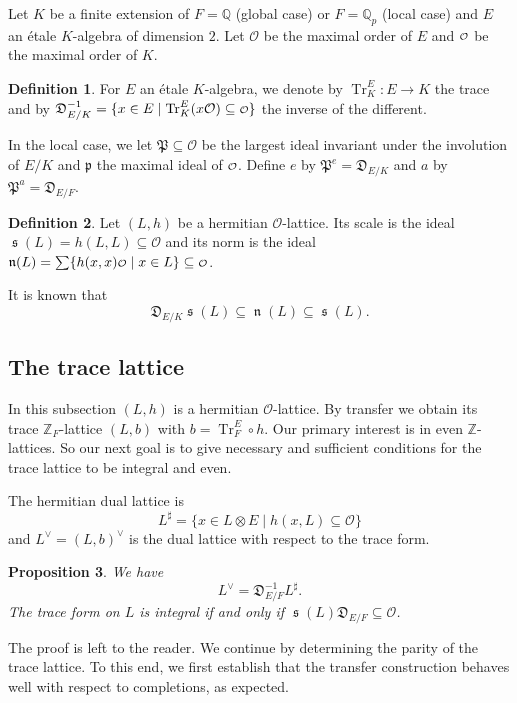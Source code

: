 \documentclass[a4paper]{amsart}
\theoremstyle{definition}
\newtheorem{definition}{Definition}[section]
\theoremstyle{plain}
\newtheorem{proposition}[definition]{Proposition}
\DeclareMathOperator{\Tr}{Tr}
\DeclareMathOperator{\scale}{\mathfrak{s}}
\DeclareMathOperator{\norm}{\mathfrak{n}}
\newcommand{\QQ}{\mathbb{Q}}
\newcommand{\ZZ}{\mathbb{Z}}
\renewcommand{\O}{\mathcal{O}}
\newcommand{\fp}{\mathfrak{p}}
\newcommand{\FP}{\mathfrak{P}}
\newcommand{\FD}{\mathfrak{D}}
\renewcommand\o{
  \mathchoice
    {{\scriptstyle\mathcal{O}}}%
    {{\scriptstyle\mathcal{O}}}%
    {{\scriptscriptstyle\mathcal{O}}}%
    {\scalebox{.7}{$\scriptscriptstyle\mathcal{O}$}}%
  }
\newcommand{\sprodq}[2]{h( #1,#1)}
\begin{document}
Let $K$ be a finite extension of $F=\QQ$ (global case) or $F=\QQ_p$ (local case) and $E$ an étale $K$-algebra of dimension $2$.
Let $\O$ be the maximal order of $E$ and $\o$ be the maximal order of $K$.

\begin{definition}
 For $E$ an \'etale $K$-algebra, we denote by
 $\Tr^E_K \colon E \to K$ the trace and by
  $\FD_{E/K}^{-1}=\{ x \in E \mid \Tr^E_K(x \O) \subseteq \o \}$
 the inverse of the different.
\end{definition}

In the local case, we let $\FP\subseteq \O$ be the largest ideal invariant under the involution of $E/K$ and $\fp$ the maximal ideal of $\o$. Define $e$ by $\FP^e = \FD_{E/K}$ and $a$ by $\FP^a = \FD_{E/F}$.

\begin{definition}
 Let $(L,h)$ be a hermitian $\mathcal O$-lattice. Its scale is the ideal $\scale(L)=h(L,L)\subseteq \O$ and its norm is the ideal $\norm(L)=\sum \{ \sprodq{x}{}\o \mid x \in L \} \subseteq \o$.
\end{definition}
It is known that
\begin{equation}\label{norm-vs-scale}
 \FD_{E/K} \scale(L) \subseteq \norm(L) \subseteq \scale(L).
\end{equation}

\subsection{The trace lattice}
In this subsection $(L,h)$ is a hermitian $\O$-lattice. By transfer we obtain its trace $\ZZ_F$-lattice $(L,b)$ with $b = \Tr^E_{F} \circ h$.
Our primary interest is in even $\ZZ$-lattices. So our next goal is to give necessary and sufficient conditions for the trace lattice to be integral and even.


The hermitian dual lattice is
\[L^\sharp = \{x \in L \otimes E \mid h(x,L) \subseteq \O\}\]
and $L^\vee = (L,b)^\vee$ is the dual lattice with respect to the trace form.

\begin{proposition}\label{trace-integral}
We have
\[L^\vee = {\FD_{E/F}^{-1}} L^\sharp.\]
The trace form on $L$ is integral if and only if $\scale(L) {\FD_{E/F}} \subseteq \O$.
\end{proposition}
The proof is left to the reader.
We continue by determining the parity of the trace lattice.
To this end,
we first establish that the transfer construction behaves well with respect to completions, as expected.
\end{document}
